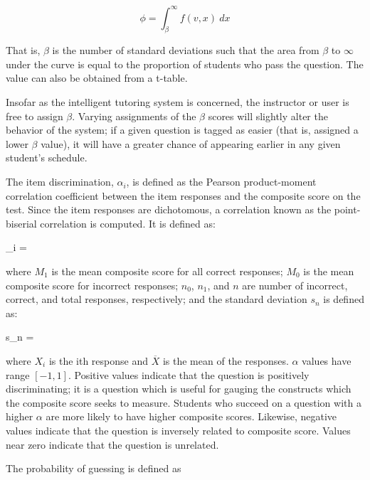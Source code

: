 \begin{equation}
  \phi = \int_{\beta}^{\infty} f(v, x) \ dx
\end{equation}

That is, $\beta$ is the number of standard deviations such that the area from
$\beta$ to $\infty$ under the curve is equal to the proportion of students who
pass the question.  The value can also be obtained from a t-table.

Insofar as the intelligent tutoring system is concerned, the instructor or user
is free to assign $\beta$.  Varying assignments of the $\beta$ scores will
slightly alter the behavior of the system; if a given question is tagged as
easier (that is, assigned a lower $\beta$ value), it will have a greater chance
of appearing earlier in any given student's schedule.

The item discrimination, $\alpha_i$, is defined as the Pearson product-moment
correlation coefficient between the item responses and the composite score on
the test.  Since the item responses are dichotomous, a correlation known as the
point-biserial correlation is computed.  It is defined as:

\begin{equations}
  \alpha_i =  
\end{equations}

where $M_1$ is the mean composite score for all correct responses; $M_0$ is the
mean composite score for incorrect responses; $n_0$, $n_1$, and $n$ are number
of incorrect, correct, and total responses, respectively; and the standard
deviation $s_n$ is defined as:

\begin{equations}
  s_n =  
\end{equations}

where $X_i$ is the ith response and $\overline{X}$ is the mean of the
responses.  $\alpha$ values have range $[-1, 1]$.  Positive values indicate
that the question is positively discriminating; it is a question which is
useful for gauging the constructs which the composite score seeks to measure.
Students who succeed on a question with a higher $\alpha$ are more likely to
have higher composite scores.  Likewise, negative values indicate that the
question is inversely related to composite score.  Values near zero indicate
that the question is unrelated.

The probability of guessing is defined as


